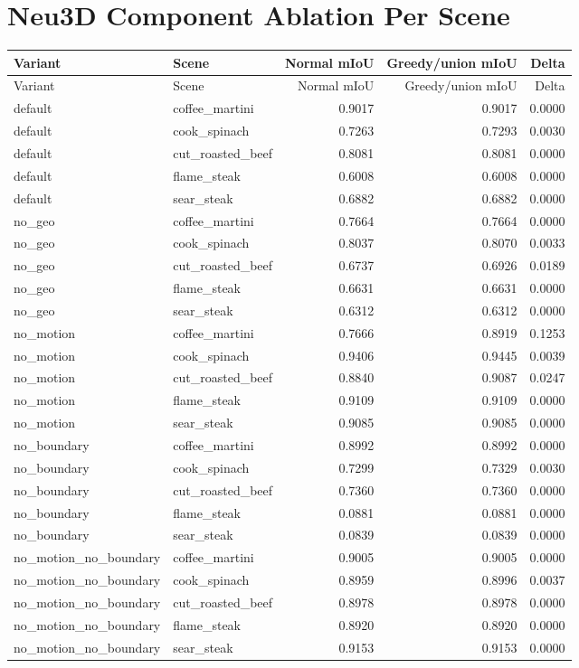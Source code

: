 \documentclass[10pt]{article}
\begin{document}
\section{Neu3D Component Ablation Per Scene}
\small
\begin{longtable}{llrrr}
\toprule
Variant & Scene & Normal mIoU & Greedy/union mIoU & Delta \\
\midrule
\endfirsthead
\toprule
Variant & Scene & Normal mIoU & Greedy/union mIoU & Delta \\
\midrule
\endhead
default & coffee\_martini & 0.9017 & 0.9017 & 0.0000 \\
default & cook\_spinach & 0.7263 & 0.7293 & 0.0030 \\
default & cut\_roasted\_beef & 0.8081 & 0.8081 & 0.0000 \\
default & flame\_steak & 0.6008 & 0.6008 & 0.0000 \\
default & sear\_steak & 0.6882 & 0.6882 & 0.0000 \\
no\_geo & coffee\_martini & 0.7664 & 0.7664 & 0.0000 \\
no\_geo & cook\_spinach & 0.8037 & 0.8070 & 0.0033 \\
no\_geo & cut\_roasted\_beef & 0.6737 & 0.6926 & 0.0189 \\
no\_geo & flame\_steak & 0.6631 & 0.6631 & 0.0000 \\
no\_geo & sear\_steak & 0.6312 & 0.6312 & 0.0000 \\
no\_motion & coffee\_martini & 0.7666 & 0.8919 & 0.1253 \\
no\_motion & cook\_spinach & 0.9406 & 0.9445 & 0.0039 \\
no\_motion & cut\_roasted\_beef & 0.8840 & 0.9087 & 0.0247 \\
no\_motion & flame\_steak & 0.9109 & 0.9109 & 0.0000 \\
no\_motion & sear\_steak & 0.9085 & 0.9085 & 0.0000 \\
no\_boundary & coffee\_martini & 0.8992 & 0.8992 & 0.0000 \\
no\_boundary & cook\_spinach & 0.7299 & 0.7329 & 0.0030 \\
no\_boundary & cut\_roasted\_beef & 0.7360 & 0.7360 & 0.0000 \\
no\_boundary & flame\_steak & 0.0881 & 0.0881 & 0.0000 \\
no\_boundary & sear\_steak & 0.0839 & 0.0839 & 0.0000 \\
no\_motion\_no\_boundary & coffee\_martini & 0.9005 & 0.9005 & 0.0000 \\
no\_motion\_no\_boundary & cook\_spinach & 0.8959 & 0.8996 & 0.0037 \\
no\_motion\_no\_boundary & cut\_roasted\_beef & 0.8978 & 0.8978 & 0.0000 \\
no\_motion\_no\_boundary & flame\_steak & 0.8920 & 0.8920 & 0.0000 \\
no\_motion\_no\_boundary & sear\_steak & 0.9153 & 0.9153 & 0.0000 \\
\bottomrule
\end{longtable}
\normalsize
\end{document}
